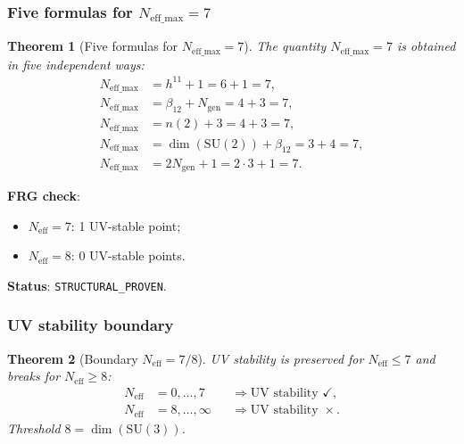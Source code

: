 \documentclass[11pt,a4paper]{article}
\newcommand{\SU}{\ensuremath{\mathrm{SU}}}
\newtheorem{theorem}{Theorem}[section]
\theoremstyle{definition}
\begin{document}
\subsubsection{Five formulas for $N_{\text{eff\_max}} = 7$}

\begin{theorem}[Five formulas for $N_{\text{eff\_max}} = 7$]
\label{thm:five-formulas-7}
The quantity $N_{\text{eff\_max}} = 7$ is obtained in five independent ways:
\begin{align}
    N_{\text{eff\_max}} &= h^{11} + 1 = 6 + 1 = 7, \\
    N_{\text{eff\_max}} &= \beta_{12} + N_{\text{gen}} = 4 + 3 = 7, \\
    N_{\text{eff\_max}} &= n(2) + 3 = 4 + 3 = 7, \\
    N_{\text{eff\_max}} &= \dim(\SU(2)) + \beta_{12} = 3 + 4 = 7, \\
    N_{\text{eff\_max}} &= 2 N_{\text{gen}} + 1 = 2 \cdot 3 + 1 = 7.
\end{align}
\end{theorem}

\noindent
\textbf{FRG check}:
\begin{itemize}
    \item $N_{\text{eff}} = 7$: 1 UV-stable point;
    \item $N_{\text{eff}} = 8$: 0 UV-stable points.
\end{itemize}

\noindent
\textbf{Status}: \texttt{STRUCTURAL\_PROVEN}.

\subsubsection{UV stability boundary}

\begin{theorem}[Boundary $N_{\text{eff}} = 7/8$]
\label{thm:frg-boundary}
UV stability is preserved for $N_{\text{eff}} \le 7$ and
breaks for $N_{\text{eff}} \ge 8$:
\begin{equation}
    \boxed{
    \begin{aligned}
        N_{\text{eff}} &= 0, \ldots, 7 &&\Rightarrow \text{UV stability } \checkmark, \\
        N_{\text{eff}} &= 8, \ldots, \infty &&\Rightarrow \text{UV stability } \times.
    \end{aligned}}
    \label{eq:frg-boundary}
\end{equation}
Threshold $8 = \dim(\SU(3))$.
\end{theorem}
\end{document}
